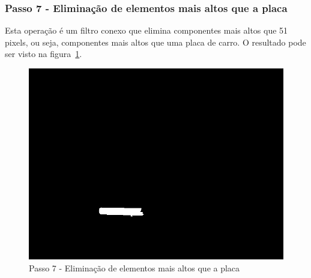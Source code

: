 \documentclass[11pt]{article} %
\begin{document}
\subsubsection{Passo 7 - Eliminação de elementos mais altos que a placa}
	Esta operação é um filtro conexo que elimina componentes mais altos que  51 pixels, ou seja, componentes mais altos que uma placa de carro. O resultado pode ser visto na figura~\ref{step6}.
	\begin{figure}[!h]
		\begin{center}
		\includegraphics[scale=0.5]{img_relatorio/step6.png}
		\caption{Passo 7 - Eliminação de elementos mais altos que a placa}\label{step6}
		\end{center}
	\end{figure}
\newpage
\end{document}
